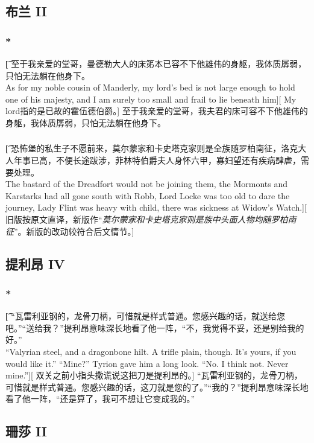 \documentclass[12pt,a4paper]{article}
\begin{document}
\subsection{布兰 II}
\subsubsection{\color{red}*}\t[
	至于我亲爱的堂哥，曼德勒大人的床笫本已容不下他雄伟的身躯，我体质孱弱，只怕无法躺在他身下。\\
	As for my noble cousin of Manderly, my lord's bed is not large enough to hold one of his majesty, and I am surely too small and frail to lie beneath him][
	My lord指的是已故的霍伍德伯爵。]
	至于我亲爱的堂哥，我夫君的床可容不下他雄伟的身躯，我体质孱弱，只怕无法躺在他身下。
	
\subsubsection{}\t[
	恐怖堡的私生子不愿前来，莫尔蒙家和卡史塔克家则是全族随罗柏南征，洛克大人年事已高，不便长途跋涉，菲林特伯爵夫人身怀六甲，寡妇望还有疾病肆虐，需要处理。\\
	The bastard of the Dreadfort would not be joining them, the Mormonts and Karstarks had all gone south with Robb, Lord Locke was too old to dare the journey, Lady Flint was heavy with child, there was sickness at Widow's Watch.][
	旧版按原文直译，新版作“\emph{莫尔蒙家和卡史塔克家则是族中头面人物均随罗柏南征}”。新版的改动较符合后文情节。]
	
\subsection{提利昂 IV}
\subsubsection{\color{red}*}\t[
	“瓦雷利亚钢的，龙骨刀柄，可惜就是样式普通。您感兴趣的话，就送给您吧。”“送给我？”提利昂意味深长地看了他一阵，“不，我觉得不妥，还是别给我的好。”\\
	“Valyrian steel, and a dragonbone hilt. A trifle plain, though. It's yours, if you would like it.” “Mine?” Tyrion gave him a long look. “No. I think not. Never mine.”][
	双关之前小指头撒谎说这把刀是提利昂的。]
	“瓦雷利亚钢的，龙骨刀柄，可惜就是样式普通。您感兴趣的话，这刀就是您的了。”“我的？”提利昂意味深长地看了他一阵，“还是算了，我可不想让它变成我的。”
	
\subsection{珊莎 II}
\end{document}
